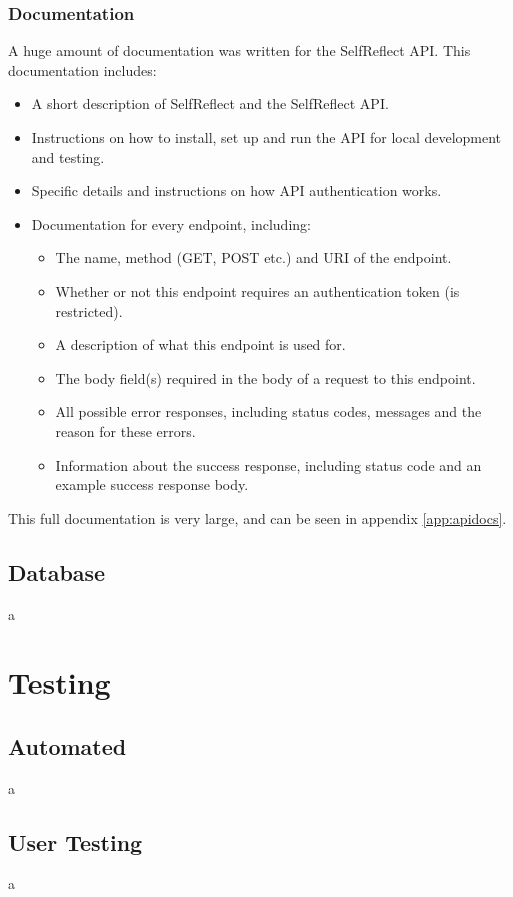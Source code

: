 \documentclass[11pt,openright,a4paper]{report}
\begin{document}
\subsection{Documentation} \label{sec:apidocs}
A huge amount of documentation was written for the SelfReflect API. This documentation includes:
\begin{itemize}
\item A short description of SelfReflect and the SelfReflect API.
\item Instructions on how to install, set up and run the API for local development and testing.
\item Specific details and instructions on how API authentication works.
\item Documentation for every endpoint, including:
  \begin{itemize}
  \item The name, method (GET, POST etc.) and URI of the endpoint.
  \item Whether or not this endpoint requires an authentication token (is restricted).
  \item A description of what this endpoint is used for.
  \item The body field(s) required in the body of a request to this endpoint.
  \item All possible error responses, including status codes, messages and the reason for these errors.
  \item Information about the success response, including status code and an example success response body.
  \end{itemize}
\end{itemize}

This full documentation is very large, and can be seen in appendix \ref{app:apidocs}.

\section{Database}
a

\chapter{Testing}
\section{Automated}
a

\section{User Testing}
a
\end{document}
